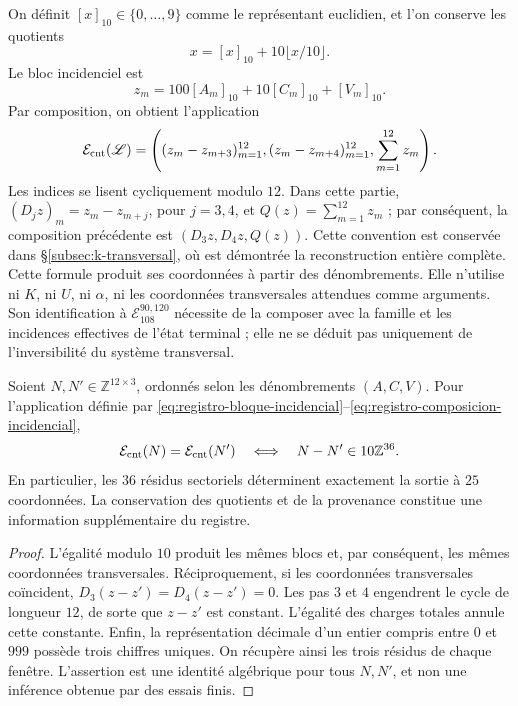 On définit \([x]_{10}\in\{0,\ldots,9\}\) comme le représentant
euclidien, et l'on conserve les quotients
\[
 x=[x]_{10}+10\lfloor x/10\rfloor.
\]
Le bloc incidenciel est
\begin{equation}
 z_m=100[A_m]_{10}+10[C_m]_{10}+[V_m]_{10}.
 \label{eq:registro-bloque-incidencial}
\end{equation}
Par composition, on obtient l'application
\begin{equation}
 \mathcal E_{\rm cnt}(\mathscr L)=
 \left((z_m-z_{m+3})_{m=1}^{12},
       (z_m-z_{m+4})_{m=1}^{12},\sum_{m=1}^{12}z_m\right).
\label{eq:registro-composicion-incidencial}
\end{equation}
Les indices se lisent cycliquement modulo \(12\). Dans cette partie,
\((D_jz)_m=z_m-z_{m+j}\), pour \(j=3,4\), et
\(Q(z)=\sum_{m=1}^{12}z_m\) ; par conséquent, la composition précédente est
\((D_3z,D_4z,Q(z))\). Cette convention est conservée dans
\S\ref{subsec:k-transversal}, où est démontrée la reconstruction
entière complète.
Cette formule produit ses coordonnées à partir des dénombrements. Elle n’utilise
ni \(K\), ni \(U\), ni \(\alpha\), ni les coordonnées transversales attendues
comme arguments. Son identification à
\(\mathcal E_{108}^{90,120}\) nécessite de la composer avec la famille et
les incidences effectives de l’état terminal ; elle ne se déduit pas uniquement
de l’inversibilité du système transversal.

\begin{proposition}
\label{prop:registro-36-residuos}
Soient \(N,N'\in\mathbb Z^{12\times3}\), ordonnés selon les dénombrements
\((A,C,V)\). Pour l'application définie par
\eqref{eq:registro-bloque-incidencial}--\eqref{eq:registro-composicion-incidencial},
\[
 \mathcal E_{\rm cnt}(N)=\mathcal E_{\rm cnt}(N')
 \quad\Longleftrightarrow\quad
 N-N'\in10\mathbb Z^{36}.
\]
En particulier, les \(36\) résidus sectoriels déterminent exactement
la sortie à \(25\) coordonnées. La conservation des quotients et
de la provenance constitue une information supplémentaire du registre.
\end{proposition}

\begin{proof}
L'égalité modulo \(10\) produit les mêmes blocs et, par conséquent,
les mêmes coordonnées transversales. Réciproquement, si les coordonnées
transversales coïncident, \(D_3(z-z')=D_4(z-z')=0\). Les pas
\(3\) et \(4\) engendrent le cycle de longueur \(12\), de sorte que
\(z-z'\) est constant. L'égalité des charges totales annule cette
constante. Enfin, la représentation décimale d'un entier compris entre
\(0\) et \(999\) possède trois chiffres uniques. On récupère ainsi les
trois résidus de chaque fenêtre. L'assertion est une identité algébrique
pour tous \(N,N'\), et non une inférence obtenue par des essais finis.
\end{proof}

